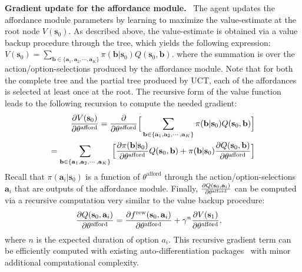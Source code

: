 \documentclass[nohyperref]{article}
\theoremstyle{plain}
\theoremstyle{definition}
\theoremstyle{remark}
\renewcommand{\paragraph}[1]{\textbf{#1}\ }
\newcommand{\state}{\mathbf{s}}
\newcommand{\action}{\mathbf{a}}
\newcommand{\afford}{\mathrm{afford}}
\newcommand{\thetaafford}{\theta^{\afford}}
\newcommand{\reward}{\mathrm{rew}}
\newcommand{\freward}{f^{\reward}}
\begin{document}
\paragraph{Gradient update for the affordance module.}
The agent updates the affordance module parameters by learning to maximize the value-estimate at the root node $ V(\state_0) $. As described above, the value-estimate is obtained via a value backup procedure through the tree,  which yields the following expression: $V(\state_0) = \sum_{\mathbf{b} \in \{ \action_1, \action_2, \cdots, \action_K \} } \pi(\mathbf{b} | \state_0) Q(\state_0, \mathbf{b})$.
where the summation is over the action/option-selections produced by the affordance module. Note that for both the complete tree and the partial tree produced by UCT, each of the affordances is selected at least once at the root. %
The recursive form of the value function leads to the following recursion to compute the needed gradient: 
\begin{align*}
    \pdv{V(\state_0)}{\thetaafford} = \pdv{}{\thetaafford} \Big[ \sum_{\mathbf{b} \in \{ \action_1, \action_2, \cdots, \action_K \} } \pi(\mathbf{b} | \state_0) Q(\state_0, \mathbf{b}) \Big] \\
    =  \sum_{\mathbf{b} \in \{ \action_1, \action_2, \cdots, \action_K \}} \Big[ \pdv{\pi(\mathbf{b} | \state_0)}{\thetaafford} Q(\state_0, \mathbf{b}) + \pi(\mathbf{b} | \state_0) \pdv{Q(\state_0, \mathbf{b})}{\thetaafford} \Big]
\end{align*}
Recall that $ \pi(\action_i | \state_0)$ is a function of $\thetaafford$ through the action/option-selections $\action_i$ that are outputs of the affordance module. 
Finally, $ \pdv{Q(\state_0, \action_i)}{\thetaafford} $ can be computed via a recursive computation very similar to the value backup procedure:
\begin{align*}
    \pdv{Q(\state_0, \action_i)}{\thetaafford} &= \pdv{\freward(\state_0, \action_i)}{\thetaafford} + \gamma^n \pdv{V(\state_1)}{\thetaafford},
\end{align*}
where $n$ is the expected duration of option $a_i$.
This recursive gradient term can be efficiently computed with existing auto-differentiation packages~\citep{griewank2008evaluating} with minor additional computational complexity.
\end{document}
